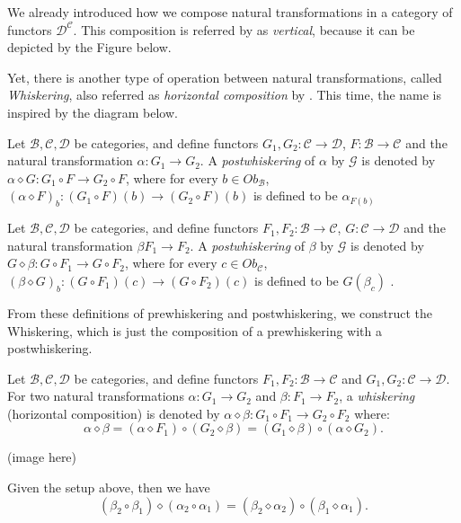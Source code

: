 We already introduced how we compose natural transformations in
a category of functors $\mathcal D^{\mathcal C}$. This composition
is referred by \citet{spivak2014category} as \textit{vertical}, because
it can be depicted by the Figure below.

Yet, there is another type of operation between natural transformations,
called \textit{Whiskering}, also referred as \textit{horizontal composition}
by \citet{spivak2014category}. This time, the name is inspired by
the diagram below.

\begin{definition}[Prewhiskering]
	Let $\mathcal B, \mathcal C, \mathcal D$ be categories, and define
	functors $G_1,G_2:\mathcal C \to \mathcal D$,
	$F:\mathcal B \to \mathcal C$ and the natural transformation
	$\alpha: G_1 \to G_2$.
	A \textit{postwhiskering}
	of $\alpha$ by $\mathcal G$ is denoted by $\alpha \diamond G:G_1 \circ F \to G_2 \circ F$,
	where for every $b \in Ob_\mathcal B$, $(\alpha \diamond F)_b:(G_1 \circ F)(b) \to (G_2 \circ F)(b)$
	is defined to be $\alpha_{F(b)}$
	\label{def:prewhiskering}
\end{definition}

\begin{definition}[Postwhiskering]
	Let $\mathcal B, \mathcal C, \mathcal D$ be categories, and define
	functors $F_1,F_2:\mathcal B \to \mathcal C$,
	$G:\mathcal C \to \mathcal D$ and the natural transformation
	$\beta F_1 \to F_2$.
	A \textit{postwhiskering}
	of $\beta$ by $\mathcal G$ is denoted by $G \diamond \beta:G \circ F_1 \to G \circ F_2$,
	where for every $c \in Ob_\mathcal C$, $(\beta \diamond G)_b:(G \circ F_1)(c) \to (G \circ F_2)(c)$
	is defined to be $G(\beta_c)$ .
	\label{def:postwhiskering}
\end{definition}

From these definitions of prewhiskering and postwhiskering, we construct the Whiskering,
which is just the composition of a prewhiskering with a postwhiskering.

\begin{definition}
	Let $\mathcal B, \mathcal C, \mathcal D$ be categories, and define
	functors $F_1,F_2:\mathcal B \to \mathcal C$ and
	$G_1, G_2 :\mathcal C \to \mathcal D$. For two natural transformations
	$\alpha: G_1 \to G_2$ and $\beta: F_1 \to F_2$,
	a \textit{whiskering} (horizontal composition)
	is denoted by
	$\alpha \diamond \beta: G_1\circ F_1 \rightarrow G_2 \circ F_2$
	where:
	\begin{displaymath}
		\alpha \diamond \beta
		= (\alpha \diamond F_1) \circ (G_2 \diamond \beta)
		= (G_1 \diamond \beta) \circ (\alpha \diamond G_2).
	\end{displaymath}
	\label{def:Whiskering}
\end{definition}

\begin{theorem}
	(image here)

	Given the setup above, then we have
	\begin{displaymath}
		(\beta_2 \circ \beta_1) \diamond (\alpha_2 \circ \alpha_1) =
		(\beta_2 \diamond \alpha_2) \circ (\beta_1 \diamond \alpha_1).
	\end{displaymath}

\end{theorem}
